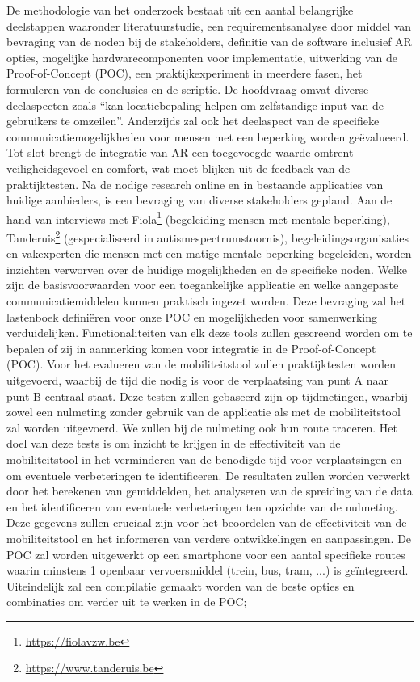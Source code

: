 De methodologie van het onderzoek bestaat uit een aantal belangrijke deelstappen waaronder literatuurstudie, een requirementsanalyse door middel van bevraging van de noden bij de stakeholders, definitie van de software inclusief AR opties, mogelijke hardwarecomponenten voor implementatie, uitwerking van de Proof-of-Concept (POC), een praktijkexperiment in meerdere fasen, het formuleren van de conclusies en de scriptie. De hoofdvraag omvat diverse deelaspecten zoals ``kan locatiebepaling helpen om zelfstandige input van de gebruikers te omzeilen''. Anderzijds zal ook het deelaspect van de specifieke communicatiemogelijkheden voor mensen met een beperking worden geëvalueerd. Tot slot brengt de integratie van AR een toegevoegde waarde omtrent veiligheidsgevoel en comfort, wat moet blijken uit de feedback van de praktijktesten. Na de nodige research online en in bestaande applicaties van huidige aanbieders, is een bevraging van diverse stakeholders gepland. Aan de hand van interviews met Fiola\footnote{\url{https://fiolavzw.be}} (begeleiding mensen met mentale beperking), Tanderuis\footnote{\url{https://www.tanderuis.be}} (gespecialiseerd in autismespectrumstoornis), begeleidingsorganisaties en vakexperten die mensen met een matige mentale beperking begeleiden, worden inzichten verworven over de huidige mogelijkheden en de specifieke noden. Welke zijn de basisvoorwaarden voor een toegankelijke applicatie en welke aangepaste communicatiemiddelen kunnen praktisch ingezet worden. Deze bevraging zal het lastenboek definiëren voor onze POC en mogelijkheden voor samenwerking verduidelijken.
Functionaliteiten van elk deze tools zullen gescreend worden om te bepalen of zij in aanmerking komen voor integratie in de Proof-of-Concept (POC).
Voor het evalueren van de mobiliteitstool zullen praktijktesten worden uitgevoerd, waarbij de tijd die nodig is voor de verplaatsing van punt A naar punt B centraal staat. 
Deze testen zullen gebaseerd zijn op tijdmetingen, waarbij zowel een nulmeting zonder gebruik van de applicatie als met de mobiliteitstool zal worden uitgevoerd. We zullen bij de nulmeting ook hun route traceren.
Het doel van deze tests is om inzicht te krijgen in de effectiviteit van de mobiliteitstool in het verminderen van de benodigde tijd voor verplaatsingen en om eventuele verbeteringen te identificeren. 
De resultaten zullen worden verwerkt door het berekenen van gemiddelden, het analyseren van de spreiding van de data en het identificeren van eventuele verbeteringen ten opzichte van de nulmeting. Deze gegevens zullen cruciaal zijn voor het beoordelen van de effectiviteit van de mobiliteitstool en het informeren van verdere ontwikkelingen en aanpassingen. De POC zal worden uitgewerkt op een smartphone voor een aantal specifieke routes waarin minstens 1 openbaar vervoersmiddel (trein, bus, tram, ...) is geïntegreerd. Uiteindelijk zal een compilatie gemaakt worden van de beste opties en combinaties om verder uit te werken in de POC; 

